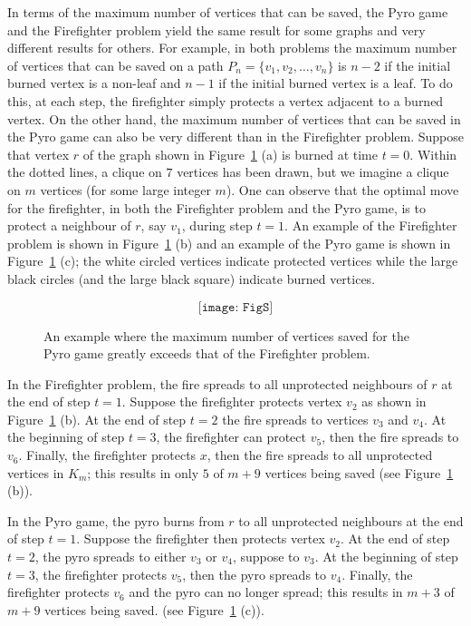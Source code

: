 \documentclass[12pt]{article}
\begin{document}
In terms of the maximum number of vertices that can be saved, the Pyro game and the Firefighter problem yield the same result for some graphs and very different results for others.  For example, in both problems the maximum number of vertices that can be saved on a path $P_n = \{v_1,v_2,\dots,v_n\}$ is $n-2$ if the initial burned vertex is a non-leaf and $n-1$ if the initial burned vertex is a leaf.  To do this, at each step, the firefighter simply protects a vertex adjacent to a burned vertex. On the other hand, the maximum number of vertices that can be saved in the Pyro game can also be very different than in the Firefighter problem.  Suppose that vertex $r$ of the graph shown in Figure~\ref{fig:spidey1} (a) is burned at time $t=0$.  Within the dotted lines, a clique on $7$ vertices has been drawn, but we imagine a clique on $m$ vertices (for some large integer $m$).  One can observe that the optimal move for the firefighter, in both the Firefighter problem and the Pyro game, is to protect a neighbour of $r$, say $v_1$, during step $t=1$.  An example of the Firefighter problem is shown in Figure~\ref{fig:spidey1} (b) and an example of the Pyro game is shown in Figure~\ref{fig:spidey1} (c); the white circled vertices indicate protected vertices while the large black circles (and the large black square) indicate burned vertices.

\begin{figure}[htbp]  \[ \texttt{[image: FigS]} \] 
\vspace{-0.3in}\caption{An example where the maximum number of vertices saved for the Pyro game greatly exceeds that of the Firefighter problem.}
\label{fig:spidey1}
\end{figure}

In the Firefighter problem, the fire spreads to all unprotected neighbours of $r$ at the end of step $t=1$.  Suppose the firefighter protects vertex $v_2$ as shown in Figure~\ref{fig:spidey1} (b).  At the end of step $t=2$ the fire spreads to vertices $v_3$ and $v_4$.  At the beginning of step $t=3$, the firefighter can protect $v_5$, then the fire spreads to $v_6$.  Finally, the firefighter protects $x$, then the fire spreads to all unprotected vertices in $K_m$; this results in only $5$ of $m+9$ vertices being saved (see Figure~\ref{fig:spidey1} (b)).

In the Pyro game, the pyro burns from $r$ to all unprotected neighbours at the end of step $t=1$.  Suppose the firefighter then protects vertex $v_2$.  At the end of step $t=2$, the pyro spreads to either $v_3$ or $v_4$, suppose to $v_3$.  At the beginning of step $t=3$, the firefighter protects $v_5$, then the pyro spreads to $v_4$.  Finally, the firefighter protects $v_6$ and the pyro can no longer spread; this results in $m+3$ of $m+9$ vertices being saved.   (see Figure~\ref{fig:spidey1} (c)).  
\end{document}

